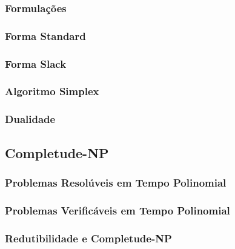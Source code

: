 \documentclass[11pt]{article}
\begin{document}
\subsubsection{Formulações}

\subsubsection*{Forma Standard}



\subsubsection*{Forma Slack}



\subsubsection{Algoritmo Simplex}

\subsubsection{Dualidade}

\newpage

\subsection{Completude-NP} 

\subsubsection{Problemas Resolúveis em Tempo Polinomial}

\subsubsection{Problemas Verificáveis em Tempo Polinomial}

\subsubsection{Redutibilidade e Completude-NP}

\newpage

\end{document}
